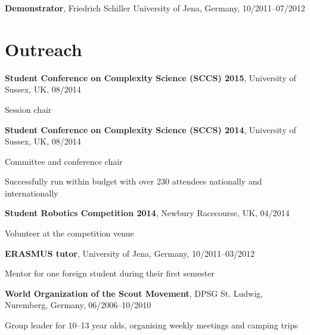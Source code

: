 \documentclass[margin,line]{res}
\newenvironment{list1}{
  \begin{list}{\ding{113}}{%
      \setlength{\itemsep}{0in}
      \setlength{\parsep}{0in} \setlength{\parskip}{0in}
      \setlength{\topsep}{0in} \setlength{\partopsep}{0in} 
      \setlength{\leftmargin}{0.17in}}}{\end{list}}
\begin{document}
\begin{resume}
{\bf Demonstrator}, Friedrich Schiller University of Jena, Germany, 10/2011--07/2012\\
\vspace*{-.1in}
\vspace*{-.2in}


\section{\sc Outreach}
{\bf Student Conference on Complexity Science (SCCS) 2015}, University of Sussex, UK, 08/2014\\
\vspace*{-.1in}
\begin{list1}
\item[] Session chair
\end{list1}
\vspace*{-.1in}
{\bf Student Conference on Complexity Science (SCCS) 2014}, University of Sussex, UK, 08/2014\\
\vspace*{-.1in}
\begin{list1}
\item[] Committee and conference chair
\item[] Successfully run within budget with over 230 attendees nationally and internationally
\end{list1}
\vspace*{-.1in}
{\bf Student Robotics Competition 2014}, Newbury Racecourse, UK, 04/2014\\
\vspace*{-.1in}
\begin{list1}
\item[] Volunteer at the competition venue
\end{list1}
\vspace*{-.1in}
{\bf ERASMUS tutor}, University of Jena, Germany, 10/2011--03/2012\\
\vspace*{-.1in}
\begin{list1}
\item[] Mentor for one foreign student during their first semester
\end{list1}
\vspace*{-.1in}
{\bf World Organization of the Scout Movement}, DPSG St. Ludwig, Nuremberg, Germany, 06/2006--10/2010\\
\vspace*{-.1in}
\begin{list1}
\item[] Group leader for 10--13 year olds, organising weekly meetings and camping trips
\end{list1}
\vspace*{-.1in}



\end{resume}
\end{document}
